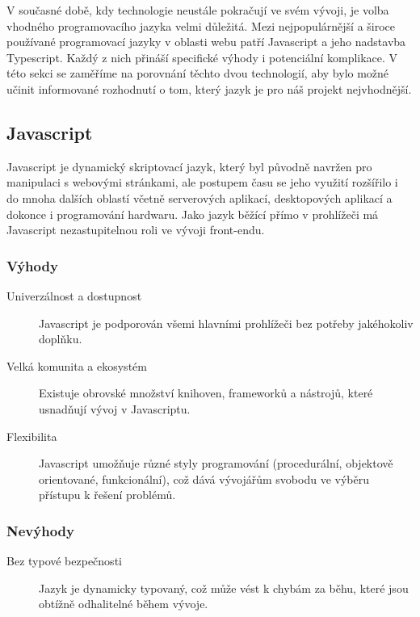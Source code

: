 V současné době, kdy technologie neustále pokračují ve svém vývoji, je volba vhodného programovacího jazyka velmi důležitá. Mezi nejpopulárnější a široce používané programovací jazyky v oblasti webu patří Javascript a jeho nadstavba Typescript. Každý z nich přináší specifické výhody i potenciální komplikace. V této sekci se zaměříme na porovnání těchto dvou technologií, aby bylo možné učinit informované rozhodnutí o tom, který jazyk je pro náš projekt nejvhodnější.

\subsection{Javascript}
Javascript je dynamický skriptovací jazyk, který byl původně navržen pro manipulaci s webovými stránkami, ale postupem času se jeho využití rozšířilo i do mnoha dalších oblastí včetně serverových aplikací, desktopových aplikací a dokonce i programování hardwaru. Jako jazyk běžící přímo v prohlížeči má Javascript nezastupitelnou roli ve vývoji front-endu. \cite{Javascript}

\subsubsection{Výhody}

\begin{description}
    \item[Univerzálnost a dostupnost] Javascript je podporován všemi hlavními prohlížeči bez potřeby jakéhokoliv doplňku.
    \item[Velká komunita a ekosystém] Existuje obrovské množství knihoven, frameworků a nástrojů, které usnadňují vývoj v Javascriptu.
    \item[Flexibilita] Javascript umožňuje různé styly programování (procedurální, objektově orientované, funkcionální), což dává vývojářům svobodu ve výběru přístupu k řešení problémů.
\end{description}

\subsubsection{Nevýhody}

\begin{description}
    \item[Bez typové bezpečnosti] Jazyk je dynamicky typovaný, což může vést k chybám za běhu, které jsou obtížně odhalitelné během vývoje.
\end{description}

